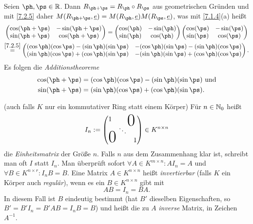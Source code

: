 \documentclass[../../main.tex]{subfiles}
\begin{document}
\begin{bsp}\label{7.2.8}
Seien $\ph,\ps\in\R$. Dann $R_{\ph+\ps}=R_\ph\circ R_\ps$ aus geometrischen Gründen und mit \ref{7.2.5} daher
$M(R_{\ph+\ps},\e)=M(R_\ph,\e)M(R_\ps,\e)$, was mit \ref{7.1.4}(a) heißt
\begin{multline*}
\begin{pmatrix}\cos(\ph+\ps)&-\sin(\ph+\ps)\\\sin(\ph+\ps)&\cos(\ph+\ps)\end{pmatrix}=
\begin{pmatrix}\cos(\ph)&-\sin(\ph)\\\sin(\ph)&\cos(\ph)\end{pmatrix}
\begin{pmatrix}\cos(\ps)&-\sin(\ps)\\\sin(\ps)&\cos(\ps)\end{pmatrix}\\
\overset{\ref{7.2.5}}=
\begin{pmatrix}
(\cos\ph)(\cos\ps)-(\sin\ph)(\sin\ps)&-(\cos\ph)(\sin\ps)-(\sin\ph)(\cos\ps)\\
(\sin\ph)(\cos\ps)+(\cos\ph)(\sin\ps)&-(\sin\ph)(\sin\ps)+(\cos\ph)(\cos\ps)
\end{pmatrix}.
\end{multline*}
Es folgen die \emph{Additionstheoreme}
\begin{align*}
\cos(\ph+\ps)&=(\cos\ph)(\cos\ps)-(\sin\ph)(\sin\ps)\text{ und}\\
\sin(\ph+\ps)&=(\sin\ph)(\cos\ps)+(\cos\ph)(\sin\ps).
\end{align*}
\end{bsp}

\begin{defprop}(auch falls $K$ nur ein kommutativer Ring statt einem Körper)\label{7.2.9}
Für $n\in\mathbb N_0$ heißt
\[I_n:=
    \begin{pmatrix}
      1 & \multicolumn{2}{c}{\text{\kern 1em\smash{\raisebox{-1.5ex}{\Huge 0}}}} \\
      & \ddots &  \\
      \multicolumn{2}{c}{\text{\kern-1.5em\smash{\raisebox{0ex}{\Huge 0}}}} & 1
    \end{pmatrix}\in K^{n\times n}
    \]
die \emph{Einheitsmatrix} der Größe $n$. Falls $n$ aus dem Zusammenhang klar ist, schreibt man oft $I$ statt $I_n$.
Man überprüft sofort $\forall A\in K^{m\times n}:AI_n=A$ und $\forall B\in K^{n\times r}:I_nB=B$.
Eine Matrix $A\in K^{n\times n}$ heißt \emph{invertierbar} (falls $K$ ein Körper auch \emph{regulär}), wenn es ein $B\in K^{n\times n}$ gibt mit
\[AB=I_n=BA.\]
In diesem Fall ist $B$ eindeutig bestimmt (hat $B'$ dieselben Eigenschaften, so $B'=B'I_n=B'AB=I_nB=B$) und heißt die zu $A$ \emph{inverse} Matrix, in Zeichen
$A^{-1}$.
\end{defprop}
\end{document}
